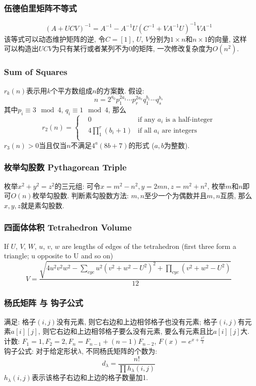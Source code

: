 \begin{small}
\subsubsection{伍德伯里矩阵不等式}
$$(A+UCV)^{-1}=A^{-1}-A^{-1}U(C^{-1}+VA^{-1}U)^{-1}VA^{-1}$$
该等式可以动态维护矩阵的逆, 令$C=[1]$, $U$, $V$分别为$1\times n$和$n\times 1$的向量, 这样可以构造出$UCV$为只有某行或者某列不为0的矩阵, 一次修改复杂度为$O(n^2)$.
\subsubsection{Sum of Squares}
$r_k(n)$表示用$k$个平方数组成$n$的方案数. 假设: 
\[n=2^{a_0}p_1^{2a_1}\cdots p_r^{2a_r}q_1^{b_1}\cdots q_s^{b_s}\]
其中$p_i\equiv 3 \mod 4$, $q_i\equiv 1 \mod 4$, 那么
\[r_2(n)=\left\{\begin{aligned}
& 0 & \text{if any }a_i\text{ is a half-integer}\\
& 4\prod_1^r(b_i+1) & \text{if all }a_i\text{ are integers}\\
\end{aligned}\right.\]
$r_3(n)>0$当且仅当$n$不满足$4^a(8b+7)$的形式 ($a,b$为整数).
\subsubsection{枚举勾股数 Pythagorean Triple}
枚举$x^2+y^2=z^2$的三元组: 可令$x=m^2-n^2,y=2mn,z=m^2+n^2$, 枚举$m$和$n$即可$O(n)$枚举勾股数. 判断素勾股数方法: $m,n$至少一个为偶数并且$m,n$互质, 那么$x,y,z$就是素勾股数.
\subsubsection{四面体体积 Tetrahedron Volume}
If $U$, $V$, $W$, $u$, $v$, $w$ are lengths of edges of the tetrahedron (first three form a triangle; u opposite to U and so on)
\[ V = \frac{\sqrt{ 4u^2v^2w^2 - \sum_{cyc}{u^2(v^2+w^2-U^2)^2} + \prod_{cyc}{(v^2+w^2-U^2)} }}{12} \]
\subsubsection{杨氏矩阵 与 钩子公式}
满足: 格子$(i,j)$没有元素, 则它右边和上边相邻格子也没有元素; 格子$(i,j)$有元素$a[i][j]$, 则它右边和上边相邻格子要么没有元素, 要么有元素且比$a[i][j]$大.\\
计数: $F_1=1,F_2=2,F_n=F_{n-1}+(n-1)F_{n-2}$, $F(x)=e^{x+\frac{x^2}{2}}$\\
钩子公式: 对于给定形状$\lambda$, 不同杨氏矩阵的个数为:
\[d_\lambda=\frac{n!}{\prod h_\lambda(i,j)}\]
$h_\lambda(i,j)$表示该格子右边和上边的格子数量加1. 


\end{small}
